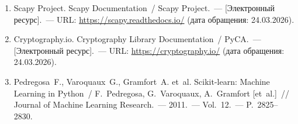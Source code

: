 \begin{enumerate}
  \item Scapy Project. Scapy Documentation~/ Scapy Project.~--- [Электронный ресурс].~--- URL: \url{https://scapy.readthedocs.io/} (дата обращения: 24.03.2026).

  \item Cryptography.io. Cryptography Library Documentation~/ PyCA.~--- [Электронный ресурс].~--- URL: \url{https://cryptography.io/} (дата обращения: 24.03.2026).

  \item Pedregosa~F., Varoquaux~G., Gramfort~A. et~al. Scikit-learn: Machine Learning in Python~/ F.~Pedregosa, G.~Varoquaux, A.~Gramfort [et~al.]~// Journal of Machine Learning Research.~--- 2011.~--- Vol.~12.~--- P.~2825--2830.
\end{enumerate}
